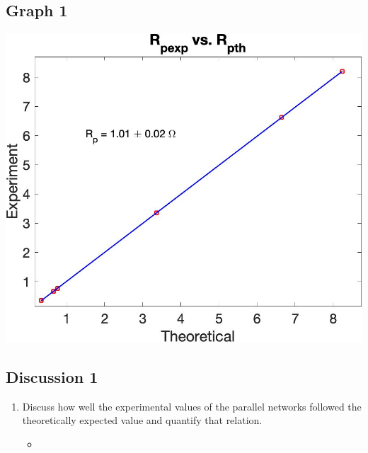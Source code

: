 \documentclass{article}
\begin{document}
\begin{table}[!htp]
\begin{center}
    \subsection*{Graph 1}
    \includegraphics[scale=0.18]{RP_graph.jpeg}
    \subsection*{Discussion 1}
    \begin{enumerate}
      \item Discuss how well the experimental values of the parallel networks followed the theoretically expected value and quantify that relation.
      \begin{itemize}
        \item
      \end{itemize}
    \end{enumerate}
  \end{center}
\end{table}
\newpage
\end{document}
